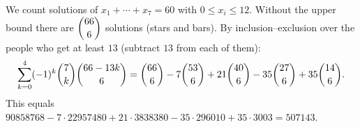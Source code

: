 We count solutions of $x_1+\cdots+x_7=60$ with $0\le x_i\le12$. Without the upper bound there are $\dbinom{66}{6}$ solutions (stars and bars). By inclusion--exclusion over the people who get at least $13$ (subtract $13$ from each of them):
\[\sum_{k=0}^{4}(-1)^k\dbinom7k\dbinom{66-13k}{6}=\dbinom{66}6-7\dbinom{53}6+21\dbinom{40}6-35\dbinom{27}6+35\dbinom{14}6.\]
This equals $90858768-7\cdot22957480+21\cdot3838380-35\cdot296010+35\cdot3003=\boxed{507143}$.
